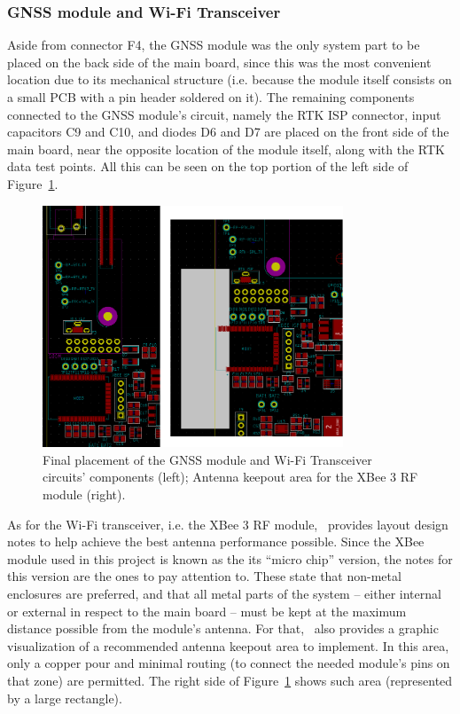 \subsubsection{GNSS module and Wi-Fi Transceiver}\label{sec:5117_ZED_XBEE}

Aside from connector F4, the GNSS module was the only system part to be placed on the back side of the main board, since this was the most convenient location due to its mechanical structure (i.e. because the module itself consists on a small PCB with a pin header soldered on it). The remaining components connected to the GNSS module's circuit, namely the RTK ISP connector, input capacitors C9 and C10, and diodes D6 and D7 are placed on the front side of the main board, near the opposite location of the module itself, along with the RTK data test points. All this can be seen on the top portion of the left side of Figure~\ref{fig:placement_ZED_XBEE}.

\begin{figure}[h]
	\centering
	\includegraphics[width=0.8\textwidth]{Chapters/Figures/chapter5/placement_ZED_XBEE.png}
	\caption{Final placement of the GNSS module and Wi-Fi Transceiver circuits' components (left); Antenna keepout area for the XBee 3 RF module (right).}
	\label{fig:placement_ZED_XBEE}
\end{figure}

As for the Wi-Fi transceiver, i.e. the XBee 3 RF module,~\cite{XBee} provides layout design notes to help achieve the best antenna performance possible. Since the XBee module used in this project is known as the its ``micro chip'' version, the notes for this version are the ones to pay attention to. These state that non-metal enclosures are preferred, and that all metal parts of the system -- either internal or external in respect to the main board -- must be kept at the maximum distance possible from the module's antenna. For that,~\cite{XBee} also provides a graphic visualization of a recommended antenna keepout area to implement. In this area, only a copper pour and minimal routing (to connect the needed module's pins on that zone) are permitted. The right side of Figure~\ref{fig:placement_ZED_XBEE} shows such area (represented by a large rectangle).


